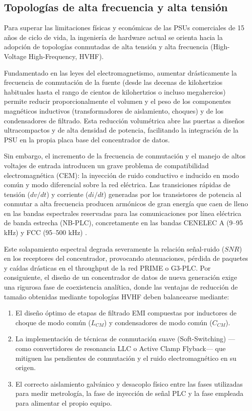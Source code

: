 \subsection{Topologías de alta frecuencia y alta tensión}
\label{subsec:topologias_alta_frecuencia_tension}

Para superar las limitaciones físicas y económicas de las PSUs comerciales de 15 años de ciclo de vida, la ingeniería de hardware actual se orienta hacia la adopción de topologías conmutadas de alta tensión y alta frecuencia (High-Voltage High-Frequency, HVHF). 
 
Fundamentado en las leyes del electromagnetismo, aumentar drásticamente la frecuencia de conmutación de la fuente (desde las decenas de kilohertzios habituales hasta el rango de cientos de kilohertzios o incluso megahercios) permite reducir proporcionalmente el volumen y el peso de los componentes magnéticos inductivos (transformadores de aislamiento, choques) y de los condensadores de filtrado. Esta reducción volumétrica abre las puertas a diseños ultracompactos y de alta densidad de potencia, facilitando la integración de la PSU en la propia placa base del concentrador de datos.

Sin embargo, el incremento de la frecuencia de conmutación y el manejo de altos voltajes de entrada introducen un grave problema de compatibilidad electromagnética (CEM): la inyección de ruido conductivo e inducido en modo común y modo diferencial sobre la red eléctrica. Las transiciones rápidas de tensión ($dv/dt$) y corriente ($di/dt$) generadas por los transistores de potencia al conmutar a alta frecuencia producen armónicos de gran energía que caen de lleno en las bandas espectrales reservadas para las comunicaciones por línea eléctrica de banda estrecha (NB-PLC), concretamente en las bandas CENELEC A (9--95 kHz) y FCC (95--500 kHz) \cite{SHARMA2017704}. 

Este solapamiento espectral degrada severamente la relación señal-ruido ($SNR$) en los receptores del concentrador, provocando atenuaciones, pérdida de paquetes y caídas drásticas en el throughput de la red PRIME o G3-PLC. Por consiguiente, el diseño de un concentrador de datos de nueva generación exige una rigurosa fase de coexistencia analítica, donde las ventajas de reducción de tamaño obtenidas mediante topologías HVHF deben balancearse mediante:
\begin{enumerate}
    \item El diseño óptimo de etapas de filtrado EMI compuestas por inductores de choque de modo común ($L_{CM}$) y condensadores de modo común ($C_{CM}$).
    \item La implementación de técnicas de conmutación suave (Soft-Switching) —como convertidores de resonancia LLC o Active Clamp Flyback— que mitiguen las pendientes de conmutación y el ruido electromagnético en su origen.
    \item El correcto aislamiento galvánico y desacoplo físico entre las fases utilizadas para medir metrología, la fase de inyección de señal PLC y la fase empleada para alimentar el propio equipo.
\end{enumerate}